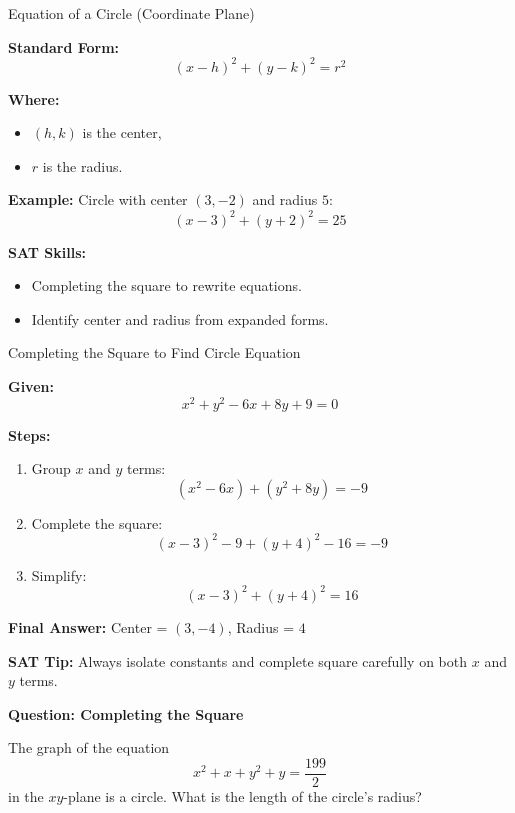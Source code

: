 \documentclass{beamer}
\begin{document}
\begin{frame}{Equation of a Circle (Coordinate Plane)}
\small

\textbf{Standard Form:}
\[
(x - h)^2 + (y - k)^2 = r^2
\]

\textbf{Where:}
\begin{itemize}
    \item $(h, k)$ is the center,
    \item $r$ is the radius.
\end{itemize}

\vspace{0.2cm}
\textbf{Example:}  
Circle with center $(3, -2)$ and radius $5$:
\[
(x - 3)^2 + (y + 2)^2 = 25
\]

\textbf{SAT Skills:}
\begin{itemize}
    \item Completing the square to rewrite equations.
    \item Identify center and radius from expanded forms.
\end{itemize}

\end{frame}



\begin{frame}{Completing the Square to Find Circle Equation}
\small

\textbf{Given:}  
\[
x^2 + y^2 - 6x + 8y + 9 = 0
\]

\vspace{0.2cm}
\textbf{Steps:}
\begin{enumerate}
    \item Group $x$ and $y$ terms:
    \[
    (x^2 - 6x) + (y^2 + 8y) = -9
    \]
    \item Complete the square:
    \[
    (x - 3)^2 - 9 + (y + 4)^2 - 16 = -9
    \]
    \item Simplify:
    \[
    (x - 3)^2 + (y + 4)^2 = 16
    \]
\end{enumerate}

\vspace{0.2cm}
\textbf{Final Answer:} Center = $(3, -4)$, Radius = $4$

\textbf{SAT Tip:} Always isolate constants and complete square carefully on both $x$ and $y$ terms.

\end{frame}

\begin{frame}{\textbf{Question: Completing the Square }}

The graph of the equation 
\[
x^2 + x + y^2 + y = \frac{199}{2}
\]
in the \(xy\)-plane is a circle. What is the length of the circle’s radius?
\end{frame}
\end{document}

